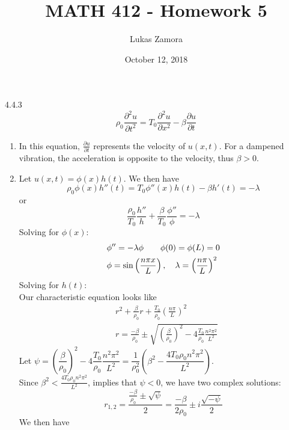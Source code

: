 \documentclass{article}
\title{MATH 412 - Homework 5}
\author{Lukas Zamora}
\date{October 12, 2018}
\theoremstyle{definition}
\begin{document}
    \maketitle
    
    \begin{prob}{4.4.3} $  $
    	\[
    		\rho_0 \frac{\partial^2 u}{\partial t^2} = T_0 \frac{\partial^2 u}{\partial x^2} - \beta \frac{\partial u}{\partial t}
    	\]
    	\begin{enumerate}[label=\alph*.)]
    		\item In this equation, $ \frac{\partial u}{\partial t} $ represents the velocity of $ u(x,t) $. For a dampened vibration, the acceleration is opposite to the velocity, thus $ \beta > 0 $.
    		\item Let $ u(x,t) = \phi(x) h(t) $. We then have 
    		\[ \rho_0 \phi(x) h''(t) = T_0 \phi''(x) h(t) - \beta h'(t) = -\lambda \]
    		or
    		\[ \frac{\rho_0}{T_0} \frac{h''}{h} + \frac{\beta}{T_0} \frac{\phi''}{\phi} = -\lambda \]
			Solving for $ \phi(x) $: 
			\begin{align*}
				&\phi'' = -\lambda \phi \qquad \phi(0) = \phi(L) = 0 \vspace{2mm}\\ 
				&\phi = \sin\left( \frac{n\pi x}{L} \right) , \quad \lambda = \left(\frac{n\pi}{L}\right)^2
			\end{align*}
			Solving for $ h(t) $: \vspace{2mm} \\
			Our characteristic equation looks like
			\begin{align*}
				& r^2 + \frac{\beta}{\rho_0}r + \frac{T_0}{\rho_0} \left( \frac{n\pi}{L} \right)^2 \\
				& r = \frac{-\beta}{\rho_0} \pm \sqrt{ \left(\frac{\beta}{\rho_0}\right)^2 - 4\frac{T_0}{\rho_0} \frac{n^2\pi^2}{L^2} }
			\end{align*}
			Let $ \psi = \left(\dfrac{\beta}{\rho_0}\right)^2 - 4\dfrac{T_0}{\rho_0} \dfrac{n^2\pi^2}{L^2} = \dfrac{1}{\rho_0^2} \left( \beta^2 - \dfrac{4T_0\rho_0 n^2 \pi^2}{L^2} \right) $.\\
			
			Since  $ \beta^2 < \frac{4T_0\rho_0 n^2 \pi^2}{L^2} $, implies that $ \psi<0 $, we have two complex solutions:
			\[ r_{1,2} = \frac{\frac{-\beta}{\rho_0} \pm \sqrt{\psi}}{2} = \frac{-\beta}{2\rho_0} \pm i \frac{\sqrt{-\psi}}{2} \]
			We then have
    	\end{enumerate}
    \end{prob}
	
	
    
    
    
\end{document}
